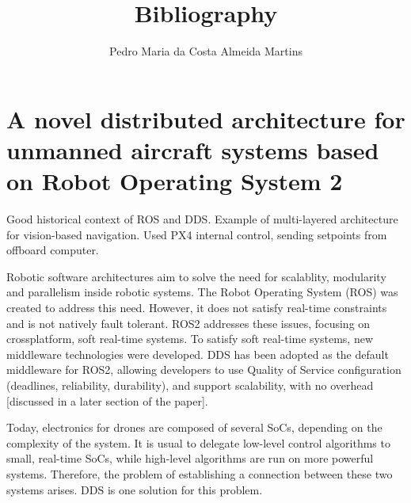 \documentclass[a4paper]{article}
\begin{document}
\title{Bibliography}
\author{Pedro Maria da Costa Almeida Martins}

\maketitle
\thispagestyle{empty}
\clearpage


\tableofcontents
\thispagestyle{empty}
\clearpage




\section{A novel distributed architecture for unmanned aircraft systems based on Robot Operating System 2}

Good historical context of ROS and DDS. 
Example of multi-layered architecture for vision-based navigation. 
Used PX4 internal control, sending setpoints from offboard computer. 

\cite{bianchi2023novel}

Robotic software architectures aim to solve the need for scalablity, modularity and parallelism inside robotic systems. 
The Robot Operating System (ROS) was created to address this need. 
However, it does not satisfy real-time constraints and is not natively fault tolerant. 
ROS2 addresses these issues, focusing on crossplatform, soft real-time systems. 
To satisfy soft real-time systems, new middleware technologies were developed. 
DDS has been adopted as the default middleware for ROS2, allowing developers to use Quality of Service configuration (deadlines, reliability, durability), and support scalability, with no overhead [discussed in a later section of the paper]. 

Today, electronics for drones are composed of several SoCs, depending on the complexity of the system. 
It is usual to delegate low-level control algorithms to small, real-time SoCs, while high-level algorithms are run on more powerful systems. 
Therefore, the problem of establishing a connection between these two systems arises. 
DDS is one solution for this problem. 
\end{document}
